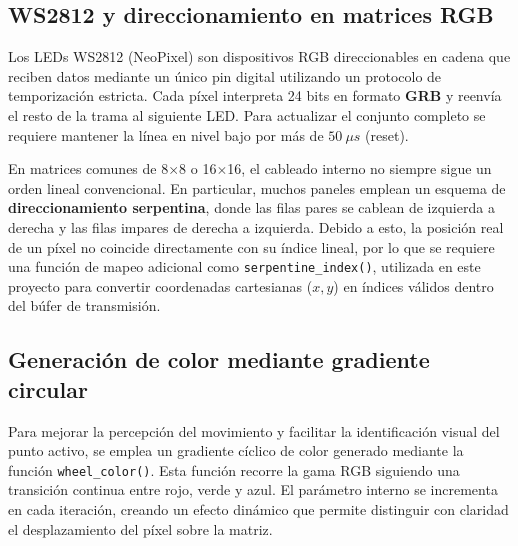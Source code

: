 \subsection{WS2812 y direccionamiento en matrices RGB}

Los LEDs WS2812 (NeoPixel) son dispositivos RGB direccionables en cadena que reciben datos mediante un único pin digital utilizando un protocolo de temporización estricta. Cada píxel interpreta 24 bits en formato \textbf{GRB} y reenvía el resto de la trama al siguiente LED. Para actualizar el conjunto completo se requiere mantener la línea en nivel bajo por más de $50~\mu s$ (reset).

En matrices comunes de 8$\times$8 o 16$\times$16, el cableado interno no siempre sigue un orden lineal convencional. En particular, muchos paneles emplean un esquema de \textbf{direccionamiento serpentina}, donde las filas pares se cablean de izquierda a derecha y las filas impares de derecha a izquierda. Debido a esto, la posición real de un píxel no coincide directamente con su índice lineal, por lo que se requiere una función de mapeo adicional como \texttt{serpentine\_index()}, utilizada en este proyecto para convertir coordenadas cartesianas (\(x, y\)) en índices válidos dentro del búfer de transmisión.


\subsection{Generación de color mediante gradiente circular}

Para mejorar la percepción del movimiento y facilitar la identificación visual del punto activo, se emplea un gradiente cíclico de color generado mediante la función \texttt{wheel\_color()}. Esta función recorre la gama RGB siguiendo una transición continua entre rojo, verde y azul. El parámetro interno se incrementa en cada iteración, creando un efecto dinámico que permite distinguir con claridad el desplazamiento del píxel sobre la matriz.

